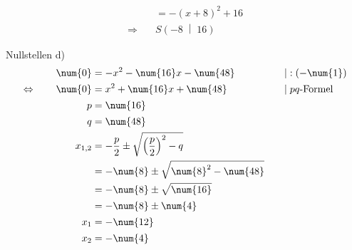 \begin{exercise}
\begin{minipage}[t]{0.49\linewidth}
\begin{equation*}
\begin{split}
          \\
          &=-(x+8)^2+16
          \\[1ex]
          \Rightarrow\quad&S\left(-8\;\middle|\;16\right)
        \end{split}
      \end{equation*}
    \end{minipage}%
    \hfill
    \begin{minipage}[t]{0.49\linewidth}
      Nullstellen d)
      \small
      \begingroup
        \newcommand{\vstrut}{\vphantom{\left(f_0^0\right)}}%
        \newcommand{\noeq}{\phantom{\Leftrightarrow}\vstrut&\quad}%
        \newcommand{\iseq}{\Leftrightarrow\vstrut&\quad}%
        \newcommand{\impl}{\Rightarrow\vstrut&\quad}%
        \newcommand{\nomod}{\quad&\phantom{|}}%
        \newcommand{\domod}[1]{\quad&|#1}%
        \begin{alignat*}{3}
          \noeq
          &
          \num{0}&=-x^{2}-\num{16}x-\num{48}
          &
          \domod{:(-\num{1})}
          \\
          \iseq
          &
          \num{0}&=x^{2}+\num{16}x+\num{48}
          &
          \domod{\;\text{$pq$-Formel}}
          \\
          \noeq
          &
          p&=\num{16}
          &
          \nomod
          \\
          \noeq
          &
          q&=\num{48}
          &
          \nomod
          \\
          \noeq
          &
          x_{1,2}&=-\frac{p}{2}\pm\sqrt{\left(\frac{p}{2}\right)^2-q}
          &
          \nomod
          \\
          \noeq
          &
          &=-\num{8}\pm\sqrt{\num{8}^2-\num{48}}
          &
          \nomod
          \\
          \noeq
          &
          &=-\num{8}\pm\sqrt{\num{16}}
          &
          \nomod
          \\
          \noeq
          &
          &=-\num{8}\pm\num{4}
          &
          \nomod
          \\
          \noeq
          &
          x_1&=-\num{12}
          &
          \nomod
          \\
          \noeq
          &
          x_2&=-\num{4}
          &
          \nomod
        \end{alignat*}
      \endgroup
    \end{minipage}\bigskip\par

\end{exercise}
